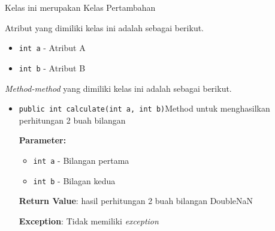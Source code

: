 \documentclass{article}
\begin{document}
\begin{enumerate}
Kelas ini merupakan Kelas Pertambahan

Atribut yang dimiliki kelas ini adalah sebagai berikut.
\begin{itemize}
\item \texttt{int a} - Atribut A
\item \texttt{int b} - Atribut B
\end{itemize}
\textit{Method-method} yang dimiliki kelas ini adalah sebagai berikut.
\begin{itemize}
\item \texttt{public int calculate(int a, int b)}Method untuk menghasilkan perhitungan 2 buah bilangan

\textbf{Parameter:}
\begin{itemize}
\item \texttt{int a} - 
Bilangan pertama
\item \texttt{int b} - 
Bilagan kedua
\end{itemize}
\textbf{Return Value}: hasil perhitungan 2 buah bilangan  DoubleNaN

\textbf{Exception}: Tidak memiliki \textit{exception}

\end{itemize}
\end{enumerate}
\end{document}
